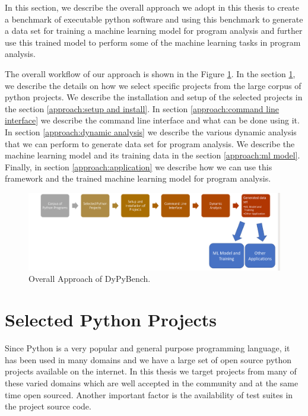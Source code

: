 In this section, we describe the overall approach we adopt in this thesis to create a benchmark of executable python software and using this benchmark to generate a data set for training a machine learning model for program analysis and further use this trained model to perform some of the machine learning tasks in program analysis.

The overall workflow of our approach is shown in the Figure \ref{fig:overall_approach}. In the section \ref{approach:selection of projects}, we describe the details on how we select specific projects from the large corpus of python projects. We describe the installation and setup of the selected projects in the section \ref{approach:setup and install}. In section \ref{approach:command line interface} we describe the command line interface and what can be done using it. In section \ref{approach:dynamic analysis} we describe the various dynamic analysis that we can perform to generate data set for program analysis. We describe the machine learning model and its training data in the section \ref{approach:ml model}. Finally, in section \ref{approach:application} we describe how we can use this framework and the trained machine learning model for program analysis.

\begin{figure}[ht]
\centering
\includegraphics[width=1\linewidth]{figures/approach/Approach2.png}
\caption[Approach]{\label{fig:overall_approach}Overall Approach of DyPyBench.}
\end{figure}

\section{Selected Python Projects}
\label{approach:selection of projects}
Since Python is a very popular and general purpose programming language, it has been used in many domains and we have a large set of open source python projects available on the internet. In this thesis we target projects from many of these varied domains which are well accepted in the community and at the same time open sourced. Another important factor is the availability of test suites in the project source code. 

